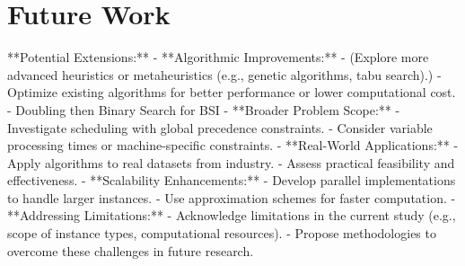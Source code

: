 \chapter{Future Work}

\begin{markdown}
**Potential Extensions:**
- **Algorithmic Improvements:**
  - (Explore more advanced heuristics or metaheuristics (e.g., genetic algorithms, tabu
    search).)
  - Optimize existing algorithms for better performance or lower computational cost.
    - Doubling then Binary Search for BSI
- **Broader Problem Scope:**
  - Investigate scheduling with global precedence constraints.
  - Consider variable processing times or machine-specific constraints.
- **Real-World Applications:**
  - Apply algorithms to real datasets from industry.
  - Assess practical feasibility and effectiveness.
- **Scalability Enhancements:**
  - Develop parallel implementations to handle larger instances.
  - Use approximation schemes for faster computation.
- **Addressing Limitations:**
  - Acknowledge limitations in the current study (e.g., scope of instance types, computational
    resources).
  - Propose methodologies to overcome these challenges in future research.
\end{markdown}